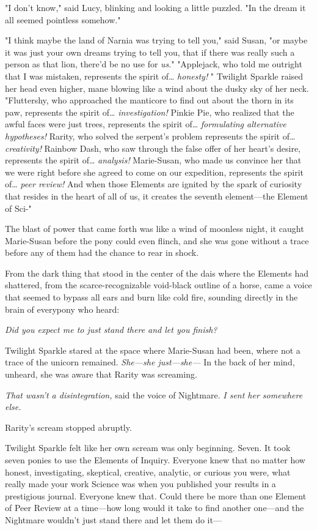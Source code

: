 "I don't know," said Lucy, blinking and looking a little puzzled. "In the dream 
it all seemed pointless somehow."

"I think maybe the land of Narnia was trying to tell you," said Susan, "or 
maybe it was just your own dreams trying to tell you, that if there was really 
such a person as that lion, there'd be no use for \emph{us}."
\sbreak
"Applejack, who told me outright that I was mistaken, represents the spirit 
of{\ldots} \emph{honesty!} " Twilight Sparkle raised her head even higher, mane 
blowing like a wind about the dusky sky of her neck. "Fluttershy, who 
approached the manticore to find out about the thorn in its paw, represents the 
spirit of{\ldots} \emph{investigation!} Pinkie Pie, who realized that the awful 
faces were just trees, represents the spirit of{\ldots} \emph{formulating 
alternative hypotheses!} Rarity, who solved the serpent's problem represents 
the spirit of{\ldots} \emph{creativity!} Rainbow Dash, who saw through the 
false offer of her heart's desire, represents the spirit of{\ldots} 
\emph{analysis!} Marie-Susan, who made us convince her that we were right 
before she agreed to come on our expedition, represents the spirit of{\ldots} 
\emph{peer review!} And when those Elements are ignited by the spark of 
curiosity that resides in the heart of all of us, it creates the seventh 
element---the Element of Sci-"

The blast of power that came forth was like a wind of moonless night, it caught 
Marie-Susan before the pony could even flinch, and she was gone without a trace 
before any of them had the chance to rear in shock.

From the dark thing that stood in the center of the dais where the Elements had 
shattered, from the scarce-recognizable void-black outline of a horse, came a 
voice that seemed to bypass all ears and burn like cold fire, sounding directly 
in the brain of everypony who heard:

\emph{Did you expect me to just stand there and let you finish?}

Twilight Sparkle stared at the space where Marie-Susan had been, where not a 
trace of the unicorn remained. \emph{She---she just---she---} In the back of 
her mind, unheard, she was aware that Rarity was screaming.

\emph{That wasn't a disintegration,} said the voice of Nightmare. \emph{I sent 
her somewhere else.}

Rarity's scream stopped abruptly.

Twilight Sparkle felt like her own scream was only beginning. Seven. It took 
seven ponies to use the Elements of Inquiry. Everyone knew that no matter how 
honest, investigating, skeptical, creative, analytic, or curious you were, what 
really made your work Science was when you published your results in a 
prestigious journal. Everyone knew that. Could there be more than one Element 
of Peer Review at a time---how long would it take to find another one---and the 
Nightmare wouldn't just stand there and let them do it---

